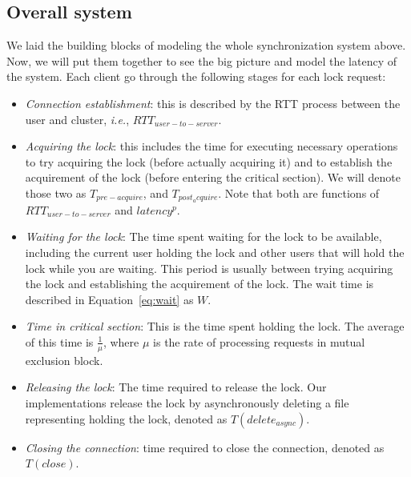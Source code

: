 \subsection{Overall system}
We laid the building blocks of modeling the whole synchronization system above. Now, we will put them together to see the big picture and model the latency of the system. Each client go through the following stages for each lock request:
\begin{itemize}
\item{\emph{Connection establishment}: this is described by the RTT process between the user and cluster, \emph{i.e.}, $RTT_{user-to-server}$.}
\item{\emph{Acquiring the lock}: this includes the time for executing necessary operations to try acquiring the lock (before actually acquiring it) and to establish the acquirement of the lock (before entering the critical section). We will denote those two as $T_{pre-acquire}$, and $T_{post_acquire}$. Note that both are functions of $RTT_{user-to-server}$ and $latency^p$.}
\item{\emph{Waiting for the lock}: The time spent waiting for the lock to be available, including the current user holding the lock and other users that will hold the lock while you are waiting. This period is usually between trying acquiring the lock and establishing the acquirement of the lock. The wait time is described in Equation~\ref{eq:wait} as $W$.}
\item{\emph{Time in critical section}: This is the time spent holding the lock. The average of this time is $\frac{1}{\mu}$, where $\mu$ is the rate of processing requests in mutual exclusion block.}
\item{\emph{Releasing the lock}: The time required to release the lock. Our implementations release the lock by asynchronously deleting a file representing holding the lock, denoted as $T(delete_{async})$. }
\item{\emph{Closing the connection}: time required to close the connection, denoted as $T(close)$. }
\end{itemize}











